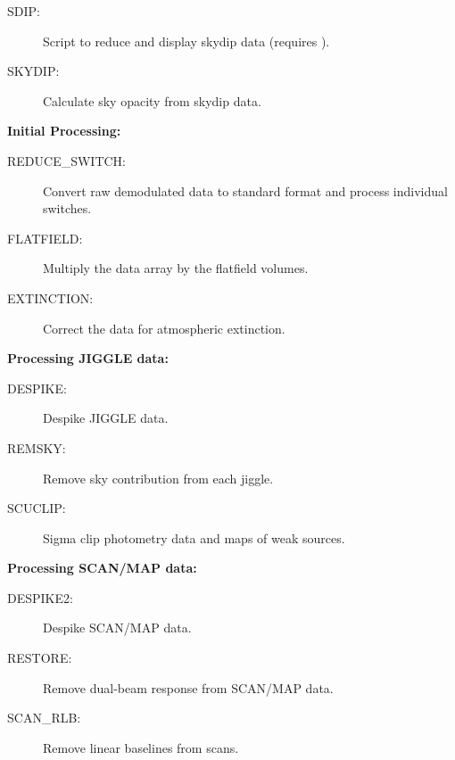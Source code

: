 \documentclass[twoside,11pt]{article}
\newcommand{\Kappa}{\xref{{\sc{Kappa}}}{sun95}{}}
\newcommand{\htmlref}[2]{#1}
\newcommand{\xref}[3]{#1}
\begin{document}
\begin{description}
\begin{description}
\item[\htmlref{SDIP}{SDIP}:] Script to reduce and display skydip data
(requires \Kappa). 

\item[\htmlref{SKYDIP}{SKYDIP}:] Calculate sky opacity from skydip data.

\end{description}

\item \textbf{Initial Processing:}

\begin{description}

\item[\htmlref{REDUCE\_SWITCH}{REDUCE_SWITCH}:] Convert raw demodulated data
to standard format and process individual switches.

\item[\htmlref{FLATFIELD}{FLATFIELD}:] Multiply the data array by the
flatfield volumes.

\item[\htmlref{EXTINCTION}{EXTINCTION}:] Correct the data for atmospheric
extinction. 


\end{description}

\item \textbf{Processing JIGGLE data:}

\begin{description}

\item[\htmlref{DESPIKE}{DESPIKE}:] Despike JIGGLE data.

\item[\htmlref{REMSKY}{REMSKY}:] Remove sky contribution from each jiggle.

\item[\htmlref{SCUCLIP}{SCUCLIP}:] Sigma clip photometry data and maps of
weak sources.

\end{description}

\item \textbf{Processing SCAN/MAP data:}

\begin{description}
\item[\htmlref{DESPIKE2}{DESPIKE2}:] Despike SCAN/MAP data.
\item[\htmlref{RESTORE}{RESTORE}:] Remove dual-beam response from SCAN/MAP
data. 
\item[\htmlref{SCAN\_RLB}{SCAN_RLB}:] Remove linear baselines from scans.
\end{description}


\end{description}
\end{document}
